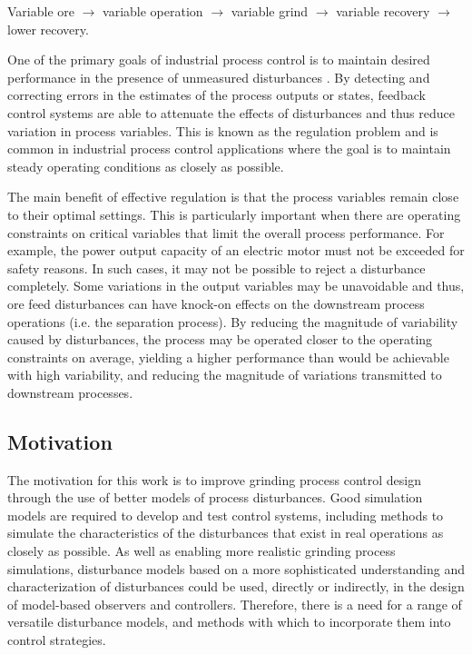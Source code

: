 Variable ore $\to$ variable operation $\to$ variable grind $\to$ variable recovery $\to$ lower recovery. 

One of the primary goals of industrial process control is to maintain desired performance in the presence of unmeasured disturbances \citep{astrom_computer_1997}. By detecting and correcting errors in the estimates of the process outputs or states, feedback control systems are able to attenuate the effects of disturbances and thus reduce variation in process variables. This is known as the regulation problem and is common in industrial process control applications where the goal is to maintain steady operating conditions as closely as possible.

The main benefit of effective regulation is that the process variables remain close to their optimal settings. This is particularly important when there are operating constraints on critical variables that limit the overall process performance. For example, the power output capacity of an electric motor must not be exceeded for safety reasons. In such cases, it may not be possible to reject a disturbance completely. Some variations in the output variables may be unavoidable and thus, ore feed disturbances can have knock-on effects on the downstream process operations (i.e. the separation process). By reducing the magnitude of variability caused by disturbances, the process may be operated closer to the operating constraints on average, yielding a higher performance than would be achievable with high variability, and reducing the magnitude of variations transmitted to downstream processes.

\subsection*{Motivation}

The motivation for this work is to improve grinding process control design through the use of better models of process disturbances. Good simulation models are required to develop and test control systems, including methods to simulate the characteristics of the disturbances that exist in real operations as closely as possible. As well as enabling more realistic grinding process simulations, disturbance models based on a more sophisticated understanding and characterization of disturbances could be used, directly or indirectly, in the design of model-based observers and controllers. Therefore, there is a need for a range of versatile disturbance models, and methods with which to incorporate them into control strategies.

